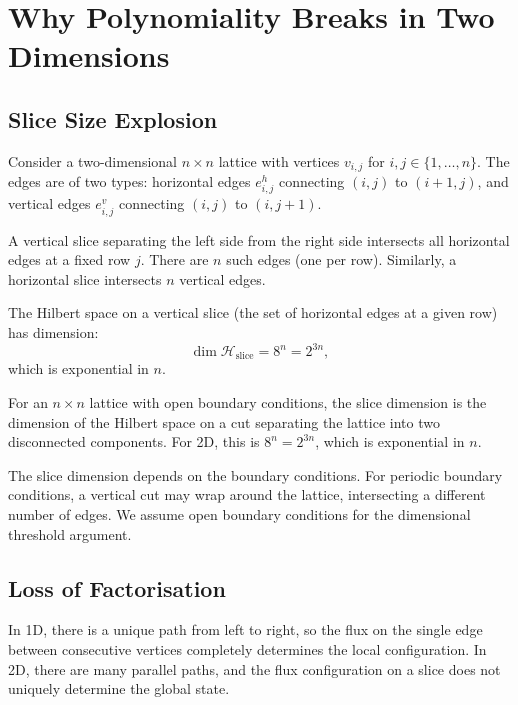 \section{Why Polynomiality Breaks in Two Dimensions}

\subsection{Slice Size Explosion}

Consider a two-dimensional $n \times n$ lattice with vertices $v_{i,j}$ for $i,j \in \{1,\dots,n\}$. The edges are of two types: horizontal edges $e_{i,j}^h$ connecting $(i,j)$ to $(i+1,j)$, and vertical edges $e_{i,j}^v$ connecting $(i,j)$ to $(i,j+1)$.

A vertical slice separating the left side from the right side intersects all horizontal edges at a fixed row $j$. There are $n$ such edges (one per row). Similarly, a horizontal slice intersects $n$ vertical edges.

The Hilbert space on a vertical slice (the set of horizontal edges at a given row) has dimension:
\begin{equation}
\dim \mathcal{H}_{\text{slice}} = 8^n = 2^{3n},
\end{equation}
which is exponential in $n$.

\begin{definition}
For an $n \times n$ lattice with open boundary conditions, the slice dimension is the dimension of the Hilbert space on a cut separating the lattice into two disconnected components. For 2D, this is $8^n = 2^{3n}$, which is exponential in $n$.
\end{definition}

\begin{remark}
The slice dimension depends on the boundary conditions. For periodic boundary conditions, a vertical cut may wrap around the lattice, intersecting a different number of edges. We assume open boundary conditions for the dimensional threshold argument.
\end{remark}

\subsection{Loss of Factorisation}

In 1D, there is a unique path from left to right, so the flux on the single edge between consecutive vertices completely determines the local configuration. In 2D, there are many parallel paths, and the flux configuration on a slice does not uniquely determine the global state.

